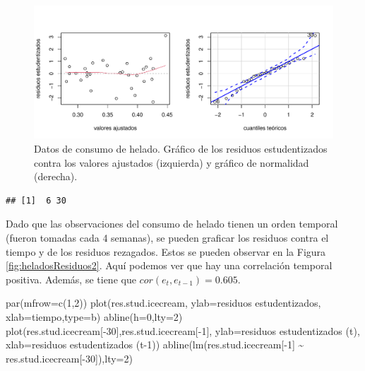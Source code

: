 \documentclass[
]{article}
\newenvironment{Shaded}{\begin{snugshade}}{\end{snugshade}}
\newcommand{\AttributeTok}[1]{\textcolor[rgb]{0.77,0.63,0.00}{#1}}
\newcommand{\DecValTok}[1]{\textcolor[rgb]{0.00,0.00,0.81}{#1}}
\newcommand{\FunctionTok}[1]{\textcolor[rgb]{0.00,0.00,0.00}{#1}}
\newcommand{\NormalTok}[1]{#1}
\newcommand{\SpecialCharTok}[1]{\textcolor[rgb]{0.00,0.00,0.00}{#1}}
\newcommand{\StringTok}[1]{\textcolor[rgb]{0.31,0.60,0.02}{#1}}
\begin{document}
\begin{figure}

{\centering \includegraphics{MLGI_files/figure-latex/heladosResiduos1-1} 

}

\caption{Datos de consumo de helado. Gráfico de los residuos estudentizados contra los valores ajustados (izquierda) y gráfico de normalidad (derecha).}\label{fig:heladosResiduos1}
\end{figure}

\begin{verbatim}
## [1]  6 30
\end{verbatim}

Dado que las observaciones del consumo de helado tienen un orden temporal (fueron tomadas cada 4 semanas), se pueden graficar los residuos contra el tiempo y de los residuos rezagados. Estos se pueden observar en la Figura \ref{fig:heladosResiduos2}. Aquí podemos ver que hay una correlación temporal positiva. Además, se tiene que \(cor(e_{t},e_{t-1}) = 0.605\).

\begin{Shaded}
\begin{Highlighting}[]
\FunctionTok{par}\NormalTok{(}\AttributeTok{mfrow=}\FunctionTok{c}\NormalTok{(}\DecValTok{1}\NormalTok{,}\DecValTok{2}\NormalTok{))}
\FunctionTok{plot}\NormalTok{(res.stud.icecream, }\AttributeTok{ylab=}\StringTok{\textquotesingle{}residuos estudentizados\textquotesingle{}}\NormalTok{,}
     \AttributeTok{xlab=}\StringTok{\textquotesingle{}tiempo\textquotesingle{}}\NormalTok{,}\AttributeTok{type=}\StringTok{\textquotesingle{}b\textquotesingle{}}\NormalTok{)}
\FunctionTok{abline}\NormalTok{(}\AttributeTok{h=}\DecValTok{0}\NormalTok{,}\AttributeTok{lty=}\DecValTok{2}\NormalTok{)}
\FunctionTok{plot}\NormalTok{(res.stud.icecream[}\SpecialCharTok{{-}}\DecValTok{30}\NormalTok{],res.stud.icecream[}\SpecialCharTok{{-}}\DecValTok{1}\NormalTok{], }\AttributeTok{ylab=}\StringTok{\textquotesingle{}residuos estudentizados (t)\textquotesingle{}}\NormalTok{,}
     \AttributeTok{xlab=}\StringTok{\textquotesingle{}residuos estudentizados (t{-}1)\textquotesingle{}}\NormalTok{)}
\FunctionTok{abline}\NormalTok{(}\FunctionTok{lm}\NormalTok{(res.stud.icecream[}\SpecialCharTok{{-}}\DecValTok{1}\NormalTok{] }\SpecialCharTok{\textasciitilde{}}\NormalTok{ res.stud.icecream[}\SpecialCharTok{{-}}\DecValTok{30}\NormalTok{]),}\AttributeTok{lty=}\DecValTok{2}\NormalTok{)}
\end{Highlighting}
\end{Shaded}
\end{document}
